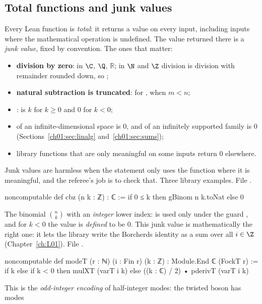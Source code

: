\subsection{Total functions and junk values}\label{ch01:sec:junk}

Every Lean function is \emph{total}: it returns a value on every input, including inputs where the
mathematical operation is undefined. The value returned there is a \emph{junk value}, fixed by
convention. The ones that matter:
\begin{itemize}
\item \textbf{division by zero}:  in $\C$, $\Q$, $\mathbb R$; in $\N$ and $\Z$
  division is division with remainder rounded down, so ;
\item \textbf{natural subtraction is truncated}: for ,  when $m<n$;
\item {}:  is $k$ for $k\ge0$ and $0$ for $k<0$;
\item {} of an infinite-dimensional space is $0$, and  of an infinitely
  supported family is $0$ (Sections~\ref{ch01:sec:linalg} and~\ref{ch01:sec:sums});
\item library functions that are only meaningful on some inputs return $0$ elsewhere.
\end{itemize}
Junk values are harmless when the statement only uses the function where it is meaningful, and
the referee's job is to check that. Three library examples.
\noindent File .
\begin{leancode}
noncomputable def cbz (n k : ℤ) : ℂ := if 0 ≤ k then gBinom n k.toNat else 0
\end{leancode}
The binomial $\binom nk$ with an \emph{integer} lower index:  is used only under the
guard , and for $k<0$ the value is \emph{defined} to be $0$. This junk value is
mathematically the right one: it lets the library write the Borcherds identity as a sum over all
$i\in\Z$ (Chapter~\ref{ch:L01}).
\noindent File .
\begin{leancode}
noncomputable def modeT (r : ℕ) (i : Fin r) (k : ℤ) : Module.End ℂ (FockT r) :=
  if k %
  else if k < 0 then mulXT (varT i k)
  else ((k : ℂ) / 2) • pderivT (varT i k)
\end{leancode}
This is the \emph{odd-integer encoding} of half-integer modes: the twisted boson has modes
